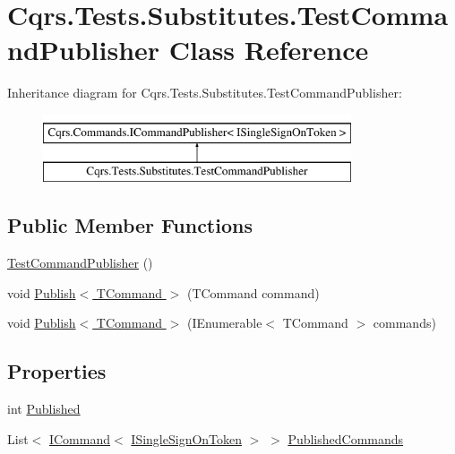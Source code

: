\hypertarget{classCqrs_1_1Tests_1_1Substitutes_1_1TestCommandPublisher}{}\section{Cqrs.\+Tests.\+Substitutes.\+Test\+Command\+Publisher Class Reference}
\label{classCqrs_1_1Tests_1_1Substitutes_1_1TestCommandPublisher}
Inheritance diagram for Cqrs.\+Tests.\+Substitutes.\+Test\+Command\+Publisher\+:\begin{figure}[H]
\begin{center}
\leavevmode
\includegraphics[height=2.000000cm]{classCqrs_1_1Tests_1_1Substitutes_1_1TestCommandPublisher}
\end{center}
\end{figure}
\subsection*{Public Member Functions}
\begin{DoxyCompactItemize}
\item 
\hyperlink{classCqrs_1_1Tests_1_1Substitutes_1_1TestCommandPublisher_a4bb33381cc8c0e51c7e24d8369364f6c}{Test\+Command\+Publisher} ()
\item 
void \hyperlink{classCqrs_1_1Tests_1_1Substitutes_1_1TestCommandPublisher_a4160ec853871961906b604ed9d505fee}{Publish$<$ T\+Command $>$} (T\+Command command)
\item 
void \hyperlink{classCqrs_1_1Tests_1_1Substitutes_1_1TestCommandPublisher_a233f543ee8eca6fdea42b351da517fa1}{Publish$<$ T\+Command $>$} (I\+Enumerable$<$ T\+Command $>$ commands)
\end{DoxyCompactItemize}
\subsection*{Properties}
\begin{DoxyCompactItemize}
\item 
int \hyperlink{classCqrs_1_1Tests_1_1Substitutes_1_1TestCommandPublisher_a7ca8e3b16e648a68eb2e5f6c24dae6a7}{Published}
\item 
List$<$ \hyperlink{interfaceCqrs_1_1Commands_1_1ICommand}{I\+Command}$<$ \hyperlink{interfaceCqrs_1_1Authentication_1_1ISingleSignOnToken}{I\+Single\+Sign\+On\+Token} $>$ $>$ \hyperlink{classCqrs_1_1Tests_1_1Substitutes_1_1TestCommandPublisher_a55e6aeb09f05f73131be61b984bc5e8c}{Published\+Commands}
\end{DoxyCompactItemize}



